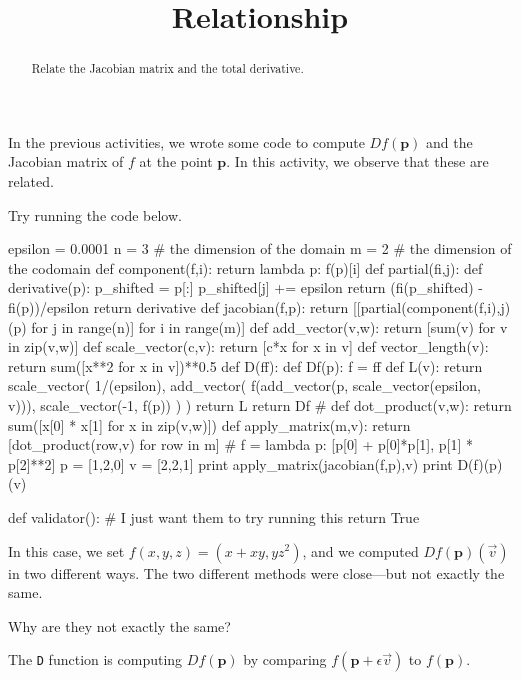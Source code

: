 \documentclass{ximera}
\title{Relationship}
\begin{document}
\begin{abstract}
  Relate the Jacobian matrix and the total derivative.
\end{abstract}\maketitle

In the previous activities, we wrote some code to compute
$Df(\mathbf{p})$ and the Jacobian matrix of $f$ at the point
$\mathbf{p}$.  In this activity, we observe that these are related.

\begin{exercise}
Try running the code below.
\begin{solution}
    \begin{python}
epsilon = 0.0001
n = 3 # the dimension of the domain
m = 2 # the dimension of the codomain
def component(f,i):
  return lambda p: f(p)[i]
def partial(fi,j):
  def derivative(p):
    p_shifted = p[:]
    p_shifted[j] += epsilon
    return (fi(p_shifted) - fi(p))/epsilon
  return derivative
def jacobian(f,p):
  return [[partial(component(f,i),j)(p) for j in range(n)] for i in range(m)]
def add_vector(v,w):
  return [sum(v) for v in zip(v,w)]
def scale_vector(c,v):
  return [c*x for x in v]
def vector_length(v):
  return sum([x**2 for x in v])**0.5
def D(ff):
  def Df(p):
    f = ff
    def L(v):
      return scale_vector( 1/(epsilon),
                           add_vector( f(add_vector(p, scale_vector(epsilon, v))),
                                       scale_vector(-1, f(p)) ) )
    return L
  return Df
#
def dot_product(v,w):
  return sum([x[0] * x[1] for x in zip(v,w)])
def apply_matrix(m,v):
  return [dot_product(row,v) for row in m]
#
f = lambda p: [p[0] + p[0]*p[1], p[1] * p[2]**2]
p = [1,2,0]
v = [2,2,1]
print apply_matrix(jacobian(f,p),v)
print D(f)(p)(v)

def validator():
  # I just want them to try running this
  return True
    \end{python}
\end{solution}

In this case, we set $f(x,y,z) = (x + xy, yz^2)$, and we computed
$Df(\mathbf{p})(\vec{v})$ in two different ways.  The two different methods were close---but not exactly the same.

Why are they not exactly the same?
\begin{free-response}
  The \texttt{D} function is computing $Df(\mathbf{p})$ by comparing
  $f(\mathbf{p} + \epsilon \vec{v})$ to $f(\mathbf{p})$.


\end{free-response}
\end{exercise}
\end{document}
